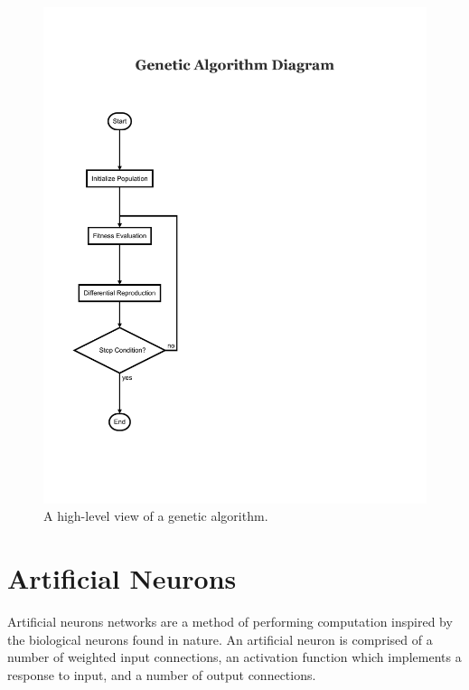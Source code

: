 \documentclass[master]{outhesis}
\begin{document}
\begin{figure}[H]
	\centering
	\includegraphics{GeneticAlgorithm.pdf}
	\caption{A high-level view of a genetic algorithm.}
\end{figure}

\section{Artificial Neurons}

Artificial neurons networks are a method of performing computation inspired by the biological neurons found in nature.
An artificial neuron is comprised of a number of weighted input connections, an activation function which implements a response to input, and a number of output connections.
\end{document}
